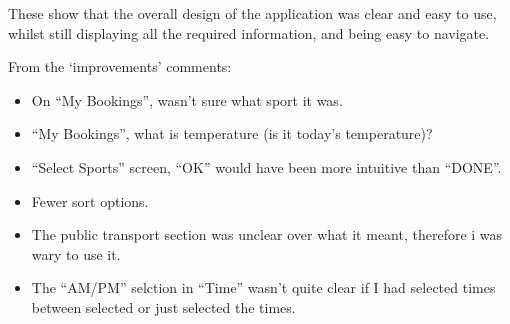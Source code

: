 These show that the overall design of the application was clear and easy to
use, whilst still displaying all the required information, and being easy to
navigate.

From the `improvements' comments:
\begin{itemize}
	\item On ``My Bookings'', wasn't sure what sport it was.
	\item ``My Bookings'', what is temperature (is it today's temperature)?
	\item ``Select Sports'' screen, ``OK'' would have been more intuitive than
		``DONE''.
	\item Fewer sort options.
	\item The public transport section was unclear over what it meant,
		therefore i was wary to use it.
	\item The ``AM/PM'' selction in ``Time'' wasn't quite clear if I had
		selected times between selected or just selected the times.
\end{itemize}
